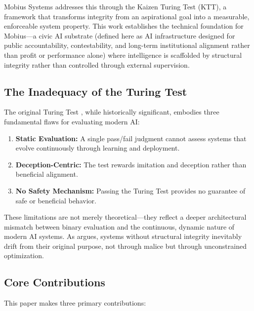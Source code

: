 \documentclass[11pt,letterpaper]{article}
\begin{document}
Mobius Systems addresses this through the Kaizen Turing Test (KTT), a framework that transforms integrity from an aspirational goal into a measurable, enforceable system property. This work establishes the technical foundation for Mobius—a civic AI substrate (defined here as AI infrastructure designed for public accountability, contestability, and long-term institutional alignment rather than profit or performance alone) where intelligence is scaffolded by structural integrity rather than controlled through external supervision.

\subsection{The Inadequacy of the Turing Test}

The original Turing Test \citep{turing1950computing}, while historically significant, embodies three fundamental flaws for evaluating modern AI:

\begin{enumerate}
    \item \textbf{Static Evaluation:} A single pass/fail judgment cannot assess systems that evolve continuously through learning and deployment.
    \item \textbf{Deception-Centric:} The test rewards imitation and deception rather than beneficial alignment.
    \item \textbf{No Safety Mechanism:} Passing the Turing Test provides no guarantee of safe or beneficial behavior.
\end{enumerate}

These limitations are not merely theoretical—they reflect a deeper architectural mismatch between binary evaluation and the continuous, dynamic nature of modern AI systems. As \citet{judan2025integrity} argues, systems without structural integrity inevitably drift from their original purpose, not through malice but through unconstrained optimization.

\subsection{Core Contributions}

This paper makes three primary contributions:
\end{document}

